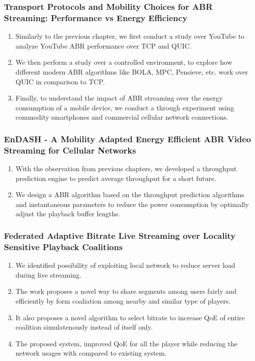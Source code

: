 \subsubsection{Transport Protocols and Mobility Choices for ABR Streaming: Performance vs Energy Efficiency}
\begin{enumerate}
	\item Similarly to the previous chapter, we first conduct a study over YouTube to analyze YouTube ABR performance over TCP and QUIC.
	\item We then perform a study over a controlled environment, to explore how different modern ABR algorithms like BOLA, MPC, Pensieve, etc. work over QUIC in comparison to TCP.
	\item Finally, to understand the impact of ABR streaming over the energy consumption of a mobile device, we conduct a through experiment using commodity smartphones and commercial cellular network connections.
\end{enumerate}

\subsubsection{EnDASH - A Mobility Adapted Energy
Efficient ABR Video Streaming for
Cellular Networks}
\begin{enumerate}
	\item With the observation from previous chapters, we developed a throughput prediction engine to predict average throughput for a short future.
	\item We design a ABR algorithm based on the throughput prediction algorithms and instantaneous parameters to reduce the power consumption by optimally adjust the playback buffer lengths.
\end{enumerate}

\subsubsection{Federated Adaptive Bitrate Live
Streaming over Locality Sensitive
Playback Coalitions}
\begin{enumerate}
	\item We identified possibility of exploiting local network to reduce server load during live streaming.
	\item The work proposes a novel way to share segments among users fairly and efficiently by form coaliation among nearby and similar type of players.
	\item It also proposes a novel algorithm to select bitrate to increase QoE of entire coalition simulatenously instead of itself only.
	\item The proposed system, improved QoE for all the player while reducing the network usages with compared to existing system.
\end{enumerate}


